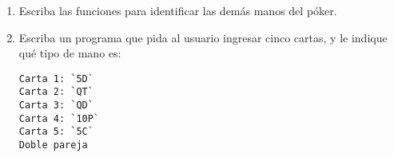\begin{enumerate}
\item
  Escriba las funciones para identificar las demás manos del póker.

\item
  Escriba un programa que pida al usuario ingresar cinco cartas, y le
  indique qué tipo de mano es:

\begin{lstlisting}[language=testcase]
Carta 1: `5D`
Carta 2: `QT`
Carta 3: `QD`
Carta 4: `10P`
Carta 5: `5C`
Doble pareja
\end{lstlisting}

\end{enumerate}
